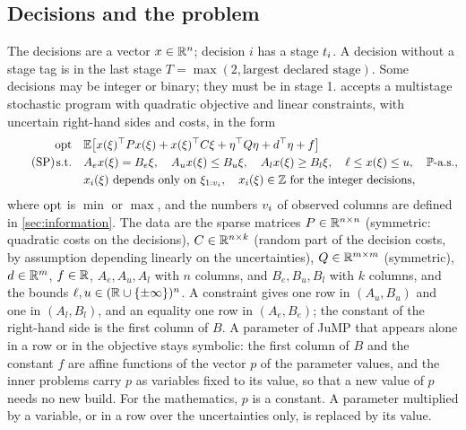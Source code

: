 \subsection{Decisions and the problem}

The decisions are a vector $x \in \mathbb{R}^n$; decision $i$ has a stage $t_i$.
A decision without a stage tag is in the last stage $T = \max(2, \text{largest declared stage})$.
Some decisions may be integer or binary; they must be in stage 1.
\pkg{} accepts a multistage stochastic program with quadratic objective and linear constraints, with uncertain right-hand sides and costs, in the form
\begin{equation}
\label{eq:SP}
\tag{SP}
\begin{aligned}
\operatorname{opt} \quad & \mathbb{E}\bigl[ x(\xi)^\top P x(\xi) + x(\xi)^\top C \xi + \eta^\top Q \eta + d^\top \eta + f \bigr] \\
\text{s.t.} \quad & A_e x(\xi) = B_e \xi, \quad A_u x(\xi) \le B_u \xi, \quad A_l x(\xi) \ge B_l \xi, \quad \ell \le x(\xi) \le u, \quad \mathbb{P}\text{-a.s.}, \\
& x_i(\xi) \text{ depends only on } \xi_{1:v_i}, \quad x_i(\xi) \in \mathbb{Z} \text{ for the integer decisions},
\end{aligned}
\end{equation}
where $\operatorname{opt}$ is $\min$ or $\max$, and the numbers $v_i$ of observed columns are defined in \cref{sec:information}.
The data are the sparse matrices
$P \in \mathbb{R}^{n \times n}$ (symmetric: quadratic costs on the decisions),
$C \in \mathbb{R}^{n \times k}$ (random part of the decision costs, by assumption depending linearly on the uncertainties),
$Q \in \mathbb{R}^{m \times m}$ (symmetric),
$d \in \mathbb{R}^m$, $f \in \mathbb{R}$,
$A_e, A_u, A_l$ with $n$ columns, and $B_e, B_u, B_l$ with $k$ columns,
and the bounds $\ell, u \in (\mathbb{R} \cup \{\pm\infty\})^n$.
A constraint  gives one row in $(A_u, B_u)$ and one in $(A_l, B_l)$,
and an equality one row in $(A_e, B_e)$;
the constant of the right-hand side is the first column of $B$.
A parameter of JuMP that appears alone in a row or in the objective stays symbolic:
the first column of $B$ and the constant $f$ are affine functions of the vector $p$ of the parameter values,
and the inner problems carry $p$ as variables fixed to its value, so that a new value of $p$ needs no new build.
For the mathematics, $p$ is a constant.
A parameter multiplied by a variable, or in a row over the uncertainties only, is replaced by its value.

